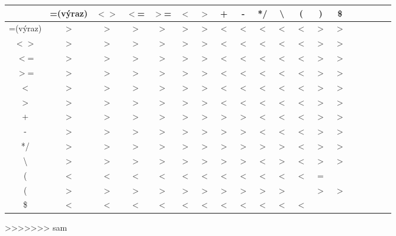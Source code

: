 \documentclass{article}
\begin{document}
        \begin{center}
        \begin{tabular}{|c|c|c|c|c|c|c|c|c|c|c|c|c|c|c|c|c|c|c|}
        \hline
                  & =(výraz) & $<>$ & $<$= & $>$= & $<$ & $>$ &  +  &  -  &  */  & \textbackslash &  (  &  )  & \$  \\ 
        \hline
        =(výraz)  &     $>$  &  $>$ &  $>$ &  $>$ & $>$ & $>$ & $<$ & $<$ &  $<$ & $<$            & $<$ & $>$ & $>$ \\ 
        \hline
          $<>$    &     $>$  &  $>$ &  $>$ &  $>$ & $>$ & $>$ & $<$ & $<$ &  $<$ & $<$            & $<$ & $>$ & $>$ \\
        \hline
          $<$=    &     $>$  &  $>$ &  $>$ &  $>$ & $>$ & $>$ & $<$ & $<$ &  $<$ & $<$            & $<$ & $>$ & $>$ \\
        \hline
          $>$=    &     $>$  &  $>$ &  $>$ &  $>$ & $>$ & $>$ & $<$ & $<$ &  $<$ & $<$            & $<$ & $>$ & $>$ \\
        \hline
          $<$     &     $>$  &  $>$ &  $>$ &  $>$ & $>$ & $>$ & $<$ & $<$ &  $<$ & $<$            & $<$ & $>$ & $>$ \\
        \hline  
          $>$     &     $>$  &  $>$ &  $>$ &  $>$ & $>$ & $>$ & $<$ & $<$ &  $<$ & $<$            & $<$ & $>$ & $>$ \\
        \hline
           +      &     $>$  &  $>$ &  $>$ &  $>$ & $>$ & $>$ & $>$ & $>$ &  $<$ & $<$            & $<$ & $>$ & $>$ \\
        \hline
           -      &     $>$  &  $>$ &  $>$ &  $>$ & $>$ & $>$ & $>$ & $>$ &  $<$ & $<$            & $<$ & $>$ & $>$ \\ 
        \hline
          */      &     $>$  &  $>$ &  $>$ &  $>$ & $>$ & $>$ & $>$ & $>$ &  $>$ & $>$            & $<$ & $>$ & $>$ \\ 
        \hline
\textbackslash    &     $>$  &  $>$ &  $>$ &  $>$ & $>$ & $>$ & $>$ & $>$ &  $<$ & $>$            & $<$ & $>$ & $>$ \\
        \hline
           (      &     $<$  &  $<$ &  $<$ &  $<$ & $<$ & $<$ & $<$ & $<$ &  $<$ & $<$            & $<$ &  =  &     \\  
        \hline
           (      &     $>$  &  $>$ &  $>$ &  $>$ & $>$ & $>$ & $>$ & $>$ &  $>$ & $>$            &     & $>$ & $>$ \\ 
        \hline
          \$      &     $<$  &  $<$ &  $<$ &  $<$ & $<$ & $<$ & $<$ & $<$ &  $<$ & $<$            & $<$ &     &     \\ 
        \hline
        \end{tabular}
    \end{center}
>>>>>>> sam
\end{document}
